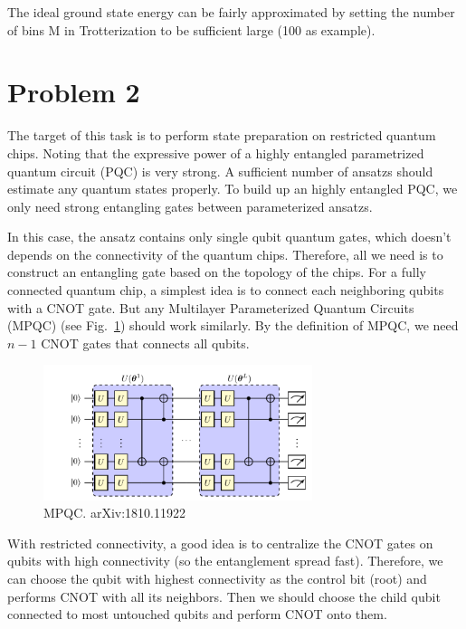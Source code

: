 \documentclass[a4paper, 11pt]{article}
\numberwithin{equation}{section}
\theoremstyle{definition}
\begin{document}
The ideal ground state energy can be fairly approximated by setting the number of bins M in Trotterization to be sufficient large (100 as example).




\section{Problem 2}


The target of this task is to perform state preparation on restricted quantum
chips. Noting that the expressive power of a highly entangled parametrized
quantum circuit (PQC) is very strong. A sufficient number of ansatzs should
estimate any quantum states properly. To build up an highly entangled PQC, we
only need strong entangling gates between parameterized ansatzs.

In this case, the ansatz contains only single qubit quantum gates, which
doesn't depends on the connectivity of the quantum chips. Therefore, all we
need is to construct an entangling gate based on the topology of the chips.
For a fully connected quantum chip, a simplest idea is to connect each
neighboring qubits with a CNOT gate. But any Multilayer Parameterized Quantum
Circuits (MPQC) (see Fig.~\ref{fig:MPQC}) should work similarly. By the definition of MPQC, we need
$n-1$ CNOT gates that connects all qubits.


\begin{figure}[t]
    \centering
    \includegraphics[width = 0.7\textwidth]{MPQC.png}
    \caption{MPQC. arXiv:1810.11922}
    \label{fig:MPQC}
\end{figure}



With restricted connectivity, a good idea is to centralize the CNOT gates on
qubits with high connectivity (so the entanglement spread fast). Therefore,
we can choose the qubit with highest connectivity as the control bit (root)
and performs CNOT with all its neighbors. Then we should choose the child
qubit connected to most untouched qubits and perform CNOT onto them.
\end{document}

